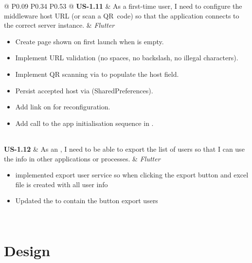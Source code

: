 \begin{longtable}{@{} P{0.09\linewidth} P{0.34\linewidth} P{0.53\linewidth} @{}}
	\textbf{US-1.11}
	& As a first-time user, I need to configure the middleware host URL (or scan
	a QR~code) so that the application connects to the correct server instance.
	& \noindent\textit{Flutter}
	\begin{itemize}[nosep, leftmargin=*]
		\item Create page  shown on first launch when  is empty.
		\item Implement URL validation (no spaces, no backslash, no illegal characters).
		\item Implement QR scanning via  to populate the host field.
		\item Persist accepted host via  (SharedPreferences).
		\item Add  link on  for reconfiguration.
		\item Add  call to the app initialisation sequence in .
	\end{itemize}\\
	\midrule
	\textbf{US-1.12}
	& As an , I need to be able to export the list of users so that I can
	use the info in other applications or processes.
	& \noindent\textit{Flutter}
	\begin{itemize}[nosep, leftmargin=*]
		\item implemented export user service so when clicking the export button and excel file is created with all user info
		\item Updated the  to contain the button export users
	\end{itemize}\\


\end{longtable}

\section{Design}
